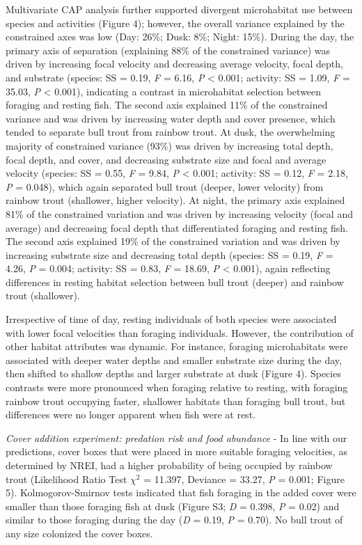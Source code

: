 \documentclass[]{article}
\begin{document}
Multivariate CAP analysis further supported divergent microhabitat use
between species and activities (Figure 4); however, the overall variance
explained by the constrained axes was low (Day: 26\%; Dusk: 8\%; Night:
15\%). During the day, the primary axis of separation (explaining 88\%
of the constrained variance) was driven by increasing focal velocity and
decreasing average velocity, focal depth, and substrate (species: SS =
0.19, \emph{F} = 6.16, \emph{P} \textless{} 0.001; activity: SS = 1.09,
\emph{F} = 35.03, \emph{P} \textless{} 0.001), indicating a contrast in
microhabitat selection between foraging and resting fish. The second
axis explained 11\% of the constrained variance and was driven by
increasing water depth and cover presence, which tended to separate bull
trout from rainbow trout. At dusk, the overwhelming majority of
constrained variance (93\%) was driven by increasing total depth, focal
depth, and cover, and decreasing substrate size and focal and average
velocity (species: SS = 0.55, \emph{F} = 9.84, \emph{P} \textless{}
0.001; activity: SS = 0.12, \emph{F} = 2.18, \emph{P} = 0.048), which
again separated bull trout (deeper, lower velocity) from rainbow trout
(shallower, higher velocity). At night, the primary axis explained 81\%
of the constrained variation and was driven by increasing velocity
(focal and average) and decreasing focal depth that differentiated
foraging and resting fish. The second axis explained 19\% of the
constrained variation and was driven by increasing substrate size and
decreasing total depth (species: SS = 0.19, \emph{F} = 4.26, \emph{P} =
0.004; activity: SS = 0.83, \emph{F} = 18.69, \emph{P} \textless{}
0.001), again reflecting differences in resting habitat selection
between bull trout (deeper) and rainbow trout (shallower).

Irrespective of time of day, resting individuals of both species were
associated with lower focal velocities than foraging individuals.
However, the contribution of other habitat attributes was dynamic. For
instance, foraging microhabitats were associated with deeper water
depths and smaller substrate size during the day, then shifted to
shallow depths and larger substrate at dusk (Figure 4). Species
contrasts were more pronounced when foraging relative to resting, with
foraging rainbow trout occupying faster, shallower habitats than
foraging bull trout, but differences were no longer apparent when fish
were at rest.

\emph{Cover addition experiment: predation risk and food abundance} - In
line with our predictions, cover boxes that were placed in more suitable
foraging velocities, as determined by NREI, had a higher probability of
being occupied by rainbow trout (Likelihood Ratio Test \(\chi^2\) =
11.397, Deviance = 33.27, \emph{P} = 0.001; Figure 5).
Kolmogorov-Smirnov tests indicated that fish foraging in the added cover
were smaller than those foraging fish at dusk (Figure S3; \emph{D} =
0.398, \emph{P} = 0.02) and similar to those foraging during the day
(\emph{D} = 0.19, \emph{P} = 0.70). No bull trout of any size colonized
the cover boxes.
\end{document}
